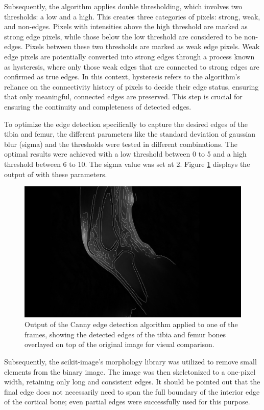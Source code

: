 \documentclass{micro-econ-thesis}
\begin{document}
Subsequently, the algorithm applies double thresholding, which involves two thresholds: a low and a high. This creates three categories of pixels: strong, weak, and non-edges. Pixels with intensities above the high threshold are marked as strong edge pixels, while those below the low threshold are considered to be non-edges. Pixels between these two thresholds are marked as weak edge pixels. Weak edge pixels are potentially converted into strong edges through a process known as hysteresis, where only those weak edges that are connected to strong edges are confirmed as true edges. In this context, hysteresis refers to the algorithm's reliance on the connectivity history of pixels to decide their edge status, ensuring that only meaningful, connected edges are preserved. This step is crucial for ensuring the continuity and completeness of detected edges.  

To optimize the edge detection specifically to capture the desired edges of the tibia and femur, the different parameters like the standard deviation of gaussian blur (sigma) and the thresholds were tested in different combinations. The optimal results were achieved with a low threshold between 0 to 5 and a high threshold between 6 to 10. The sigma value was set at 2. Figure \ref{fig:edgemitimg} displays the output of with these parameters.  
\begin{figure}[H]
	\centering
	\includegraphics[width=0.7\linewidth]{edge_new}
	\caption{Output of the Canny edge detection algorithm applied to one of the frames, showing the detected edges of the tibia and femur bones overlayed on top of the original image for visual comparison.}
	\label{fig:edgemitimg}
\end{figure}


Subsequently, the scikit-image's morphology library was utilized to remove small elements from the binary image. The image was then skeletonized to a one-pixel width, retaining only long and consistent edges. It should be pointed out that the final edge does not necessarily need to span the full boundary of the interior edge of the cortical bone; even partial edges were successfully used for this purpose.  
\end{document}
